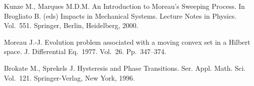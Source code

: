 \documentclass[12pt]{llncs}
\begin{document}
\begin{thebibliography}{9} %




 Kunze  M., Marques  M.D.M. An Introduction to Moreau's Sweeping Process. In  Brogliato B. (eds) Impacts in Mechanical Systems. Lecture Notes in Physics. Vol.~551. Springer, Berlin, Heidelberg, 2000.
 
 Moreau  J.-J. Evolution problem associated with a moving convex set in a Hilbert space. J. Differential Eq.~1977. Vol.~26. Pp.~347--374.  


 Brokate  M.,   Sprekels  J. Hysteresis and Phase Transitions. Ser. Appl. Math. Sci. Vol.~121.  Springer-Verlag, New York, 1996. 





\end{thebibliography}
\end{document}
